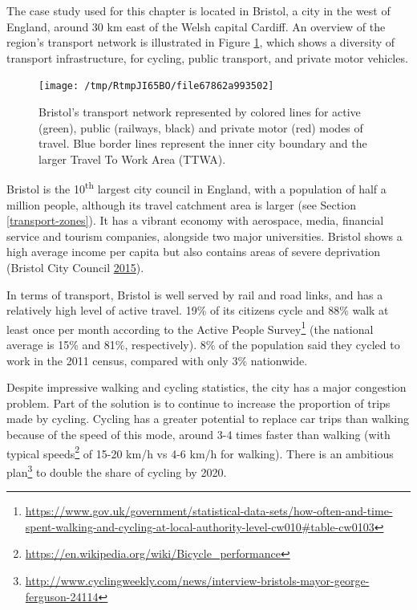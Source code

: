 \documentclass[]{krantz}
\let\rmarkdownfootnote\footnote%
\def\footnote{\protect\rmarkdownfootnote}
\renewcommand{\href}[2]{#2\footnote{\url{#1}}}
\begin{document}
The case study used for this chapter is located in Bristol, a city in the west of England, around 30 km east of the Welsh capital Cardiff.
An overview of the region's transport network is illustrated in Figure \ref{fig:bristol}, which shows a diversity of transport infrastructure, for cycling, public transport, and private motor vehicles.

\begin{figure}[t]

{\centering \texttt{[image: /tmp/RtmpJI65BO/file67862a993502]} 

}

\caption[Bristol's transport network.]{Bristol's transport network represented by colored lines for active (green), public (railways, black) and private motor (red) modes of travel. Blue border lines represent the inner city boundary and the larger Travel To Work Area (TTWA).}\label{fig:bristol}
\end{figure}

Bristol is the 10\textsuperscript{th} largest city council in England, with a population of half a million people, although its travel catchment area is larger (see Section \ref{transport-zones}).
It has a vibrant economy with aerospace, media, financial service and tourism companies, alongside two major universities.
Bristol shows a high average income per capita but also contains areas of severe deprivation (Bristol City Council \protect\hyperlink{ref-bristol_city_council_deprivation_2015}{2015}).

In terms of transport, Bristol is well served by rail and road links, and has a relatively high level of active travel.
19\% of its citizens cycle and 88\% walk at least once per month according to the \href{https://www.gov.uk/government/statistical-data-sets/how-often-and-time-spent-walking-and-cycling-at-local-authority-level-cw010\#table-cw0103}{Active People Survey} (the national average is 15\% and 81\%, respectively).
8\% of the population said they cycled to work in the 2011 census, compared with only 3\% nationwide.

Despite impressive walking and cycling statistics, the city has a major congestion problem.
Part of the solution is to continue to increase the proportion of trips made by cycling.
Cycling has a greater potential to replace car trips than walking because of the speed of this mode, around 3-4 times faster than walking (with typical \href{https://en.wikipedia.org/wiki/Bicycle_performance}{speeds} of 15-20 km/h vs 4-6 km/h for walking).
There is an ambitious \href{http://www.cyclingweekly.com/news/interview-bristols-mayor-george-ferguson-24114}{plan} to double the share of cycling by 2020.
\end{document}
